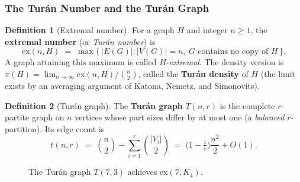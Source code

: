 \documentclass{article}
\theoremstyle{definition}
\newtheorem{definition}{Definition}
\begin{document}
\subsubsection{The Tur\'an Number and the Tur\'an Graph}

\begin{definition}[Extremal number]\label{def:exnumber}
For a graph $H$ and integer $n \ge 1$, the \textbf{extremal number}
(or \emph{Tur\'an number}) is
\[
  \mathrm{ex}(n, H) \;=\; \max\{\, |E(G)| : |V(G)| = n,\ G \text{ contains no copy of } H \,\}.
\]
A graph attaining this maximum is called $H$-\emph{extremal}. The
density version is $\pi(H) = \lim_{n \to \infty} \mathrm{ex}(n, H) / \binom{n}{2}$,
called the \textbf{Tur\'an density} of $H$ (the limit exists by an
averaging argument of Katona, Nemetz, and Simonovits).
\end{definition}

\begin{definition}[Tur\'an graph]\label{def:turangraph}
The \textbf{Tur\'an graph} $T(n, r)$ is the complete $r$-partite graph
on $n$ vertices whose part sizes differ by at most one (a
\emph{balanced} $r$-partition). Its edge count is
\[
  t(n, r) \;=\; \binom{n}{2} - \sum_{i=1}^{r} \binom{|V_i|}{2}
           \;=\; \Big(1 - \tfrac{1}{r}\Big)\frac{n^2}{2} + O(1).
\]
\end{definition}

\begin{figure}[ht]
\centering
{}
\caption{The Tur\'an graph $T(7,3)$ achieves $\mathrm{ex}(7, K_4)$.}
\label{fig:turan-graph}
\end{figure}
\end{document}
